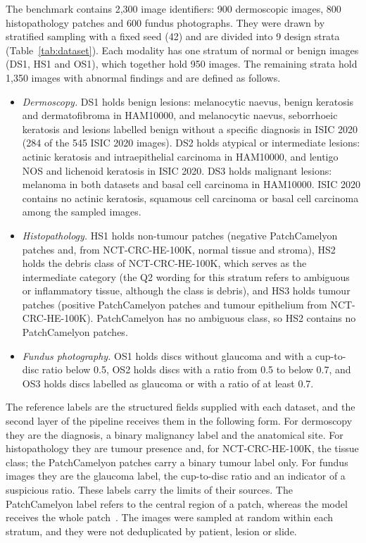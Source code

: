 \documentclass[11pt,a4paper]{article}
\providecommand{\Nimages}{2{,}300}
\providecommand{\Nstrata}{9}
\begin{document}
The benchmark contains \Nimages{} image identifiers: 900 dermoscopic images, 800 histopathology patches and 600 fundus photographs. They were drawn by stratified sampling with a fixed seed (42) and are divided into \Nstrata{} design strata (Table~\ref{tab:dataset}). Each modality has one stratum of normal or benign images (DS1, HS1 and OS1), which together hold 950 images. The remaining strata hold 1{,}350 images with abnormal findings and are defined as follows.
\begin{itemize}
  \item \emph{Dermoscopy.} DS1 holds benign lesions: melanocytic naevus, benign keratosis and dermatofibroma in HAM10000, and melanocytic naevus, seborrhoeic keratosis and lesions labelled benign without a specific diagnosis in ISIC 2020 (284 of the 545 ISIC 2020 images). DS2 holds atypical or intermediate lesions: actinic keratosis and intraepithelial carcinoma in HAM10000, and lentigo NOS and lichenoid keratosis in ISIC 2020. DS3 holds malignant lesions: melanoma in both datasets and basal cell carcinoma in HAM10000. ISIC 2020 contains no actinic keratosis, squamous cell carcinoma or basal cell carcinoma among the sampled images.
  \item \emph{Histopathology.} HS1 holds non-tumour patches (negative PatchCamelyon patches and, from NCT-CRC-HE-100K, normal tissue and stroma), HS2 holds the debris class of NCT-CRC-HE-100K, which serves as the intermediate category (the Q2 wording for this stratum refers to ambiguous or inflammatory tissue, although the class is debris), and HS3 holds tumour patches (positive PatchCamelyon patches and tumour epithelium from NCT-CRC-HE-100K). PatchCamelyon has no ambiguous class, so HS2 contains no PatchCamelyon patches.
  \item \emph{Fundus photography.} OS1 holds discs without glaucoma and with a cup-to-disc ratio below 0.5, OS2 holds discs with a ratio from 0.5 to below 0.7, and OS3 holds discs labelled as glaucoma or with a ratio of at least 0.7.
\end{itemize}




The reference labels are the structured fields supplied with each dataset, and the second layer of the pipeline receives them in the following form. For dermoscopy they are the diagnosis, a binary malignancy label and the anatomical site. For histopathology they are tumour presence and, for NCT-CRC-HE-100K, the tissue class; the PatchCamelyon patches carry a binary tumour label only. For fundus images they are the glaucoma label, the cup-to-disc ratio and an indicator of a suspicious ratio. These labels carry the limits of their sources. The PatchCamelyon label refers to the central region of a patch, whereas the model receives the whole patch~\citep{veeling2018pcam}. The images were sampled at random within each stratum, and they were not deduplicated by patient, lesion or slide.
\end{document}
